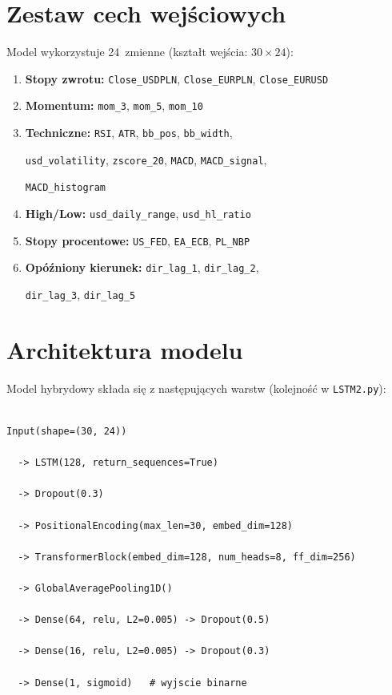 \documentclass[12pt,a4paper]{report}
\begin{document}
\section{Zestaw cech wejściowych}



Model wykorzystuje 24~zmienne (kształt wejścia: $30 \times 24$):



\begin{enumerate}

    \item \textbf{Stopy zwrotu:} \texttt{Close\_USDPLN}, \texttt{Close\_EURPLN}, \texttt{Close\_EURUSD}

    \item \textbf{Momentum:} \texttt{mom\_3}, \texttt{mom\_5}, \texttt{mom\_10}

    \item \textbf{Techniczne:} \texttt{RSI}, \texttt{ATR}, \texttt{bb\_pos}, \texttt{bb\_width},

          \texttt{usd\_volatility}, \texttt{zscore\_20}, \texttt{MACD}, \texttt{MACD\_signal},

          \texttt{MACD\_histogram}

    \item \textbf{High/Low:} \texttt{usd\_daily\_range}, \texttt{usd\_hl\_ratio}

    \item \textbf{Stopy procentowe:} \texttt{US\_FED}, \texttt{EA\_ECB}, \texttt{PL\_NBP}

    \item \textbf{Opóźniony kierunek:} \texttt{dir\_lag\_1}, \texttt{dir\_lag\_2},

          \texttt{dir\_lag\_3}, \texttt{dir\_lag\_5}

\end{enumerate}



\section{Architektura modelu}



Model hybrydowy składa się z następujących warstw (kolejność w \texttt{LSTM2.py}):



\begin{lstlisting}

Input(shape=(30, 24))

  -> LSTM(128, return_sequences=True)

  -> Dropout(0.3)

  -> PositionalEncoding(max_len=30, embed_dim=128)

  -> TransformerBlock(embed_dim=128, num_heads=8, ff_dim=256)

  -> GlobalAveragePooling1D()

  -> Dense(64, relu, L2=0.005) -> Dropout(0.5)

  -> Dense(16, relu, L2=0.005) -> Dropout(0.3)

  -> Dense(1, sigmoid)   # wyjscie binarne

\end{lstlisting}
\end{document}
